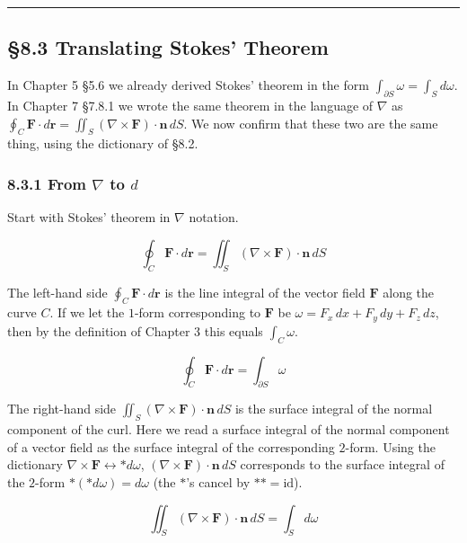 \begin{center}\rule{0.5\linewidth}{0.5pt}\end{center}

\hypertarget{translating-stokes-theorem}{%
\subsection{§8.3 Translating Stokes'
Theorem}\label{translating-stokes-theorem}}

In Chapter 5 §5.6 we already derived Stokes' theorem in the form
\(\int_{\partial S}\omega = \int_S d\omega\). In Chapter 7 §7.8.1 we
wrote the same theorem in the language of \(\nabla\) as
\(\oint_C \mathbf{F}\cdot d\mathbf{r} = \iint_S (\nabla\times\mathbf{F})\cdot\mathbf{n}\,dS\).
We now confirm that these two are the same thing, using the dictionary
of §8.2.

\hypertarget{from-nabla-to-d}{%
\subsubsection{\texorpdfstring{8.3.1 From \(\nabla\) to
\(d\)}{8.3.1 From \textbackslash nabla to d}}\label{from-nabla-to-d}}

Start with Stokes' theorem in \(\nabla\) notation.

\[\oint_C \mathbf{F} \cdot d\mathbf{r} = \iint_S (\nabla \times \mathbf{F}) \cdot \mathbf{n}\,dS\]

The left-hand side \(\oint_C \mathbf{F}\cdot d\mathbf{r}\) is the line
integral of the vector field \(\mathbf{F}\) along the curve \(C\). If we
let the \(1\)-form corresponding to \(\mathbf{F}\) be
\(\omega = F_x\,dx + F_y\,dy + F_z\,dz\), then by the definition of
Chapter 3 this equals \(\int_C \omega\).

\[\oint_C \mathbf{F} \cdot d\mathbf{r} = \int_{\partial S} \omega\]

The right-hand side
\(\iint_S (\nabla\times\mathbf{F})\cdot\mathbf{n}\,dS\) is the surface
integral of the normal component of the curl. Here we read a surface
integral of the normal component of a vector field as the surface
integral of the corresponding \(2\)-form. Using the dictionary
\(\nabla\times\mathbf{F} \leftrightarrow \ast d\omega\),
\((\nabla\times\mathbf{F})\cdot\mathbf{n}\,dS\) corresponds to the
surface integral of the \(2\)-form \(\ast(\ast d\omega) = d\omega\) (the
\(\ast\)'s cancel by \(\ast\ast = \mathrm{id}\)).

\[\iint_S (\nabla \times \mathbf{F}) \cdot \mathbf{n}\,dS = \int_S d\omega\]

